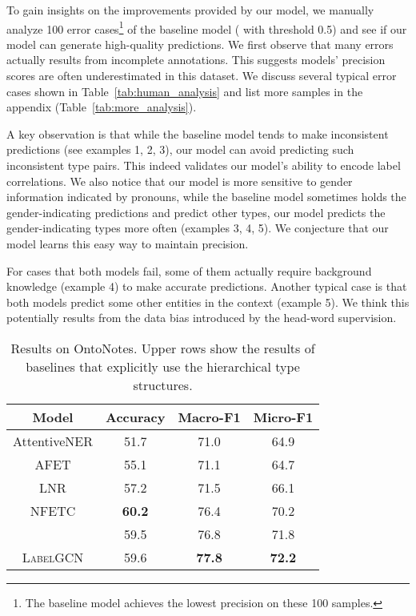 \documentclass[11pt,a4paper]{article}
\begin{document}
 To gain insights on the improvements provided by our model, we manually analyze 100 error cases\footnote{The baseline model achieves the lowest precision on these 100 samples.} of the baseline model (\citet{choi2018ultra} with threshold 0.5) and see if our model can generate high-quality predictions. We first observe that many errors actually results from incomplete annotations. This suggests models' precision scores are often underestimated in this dataset. We discuss several typical error cases shown in Table~\ref{tab:human_analysis} and list more samples in the appendix (Table~\ref{tab:more_analysis}). 

A key observation is that while the baseline model tends to make inconsistent predictions (see examples 1, 2, 3), our model can avoid predicting such inconsistent type pairs. This indeed validates our model's ability to encode label correlations. We also notice that our model is more sensitive to gender information indicated by pronouns, while the baseline model sometimes holds the gender-indicating predictions and predict other types, our model predicts the gender-indicating types more often (examples 3, 4, 5). We conjecture that our model learns this easy way to maintain precision. 

For cases that both models fail, some of them actually require background knowledge (example 4) to make accurate predictions. Another typical case is that both models predict some other entities in the context (example 5). We think this potentially results from the data bias introduced by the head-word supervision. 

\begin{table}
    \centering
    \small
    \begin{tabular}{c|ccc}
    \toprule
        \textbf{Model} &  \textbf{Accuracy} & \textbf{Macro-F1} & \textbf{Micro-F1}\\ 
        \midrule
        AttentiveNER & 51.7 & 71.0 & 64.9 \\
        AFET & 55.1 & 71.1 & 64.7\\
        LNR & 57.2 & 71.5 & 66.1\\
        NFETC & \textbf{60.2} & 76.4 & 70.2 \\
        \midrule
        \citet{choi2018ultra} & 59.5 &  76.8 & 71.8\\
        \textsc{LabelGCN} & 59.6 & \textbf{77.8} & \textbf{72.2}\\
        \bottomrule
    \end{tabular}
    \caption{Results on OntoNotes. Upper rows show the results of baselines that explicitly use the hierarchical type structures.}
    \label{tab:onto}
\end{table}
\end{document}
